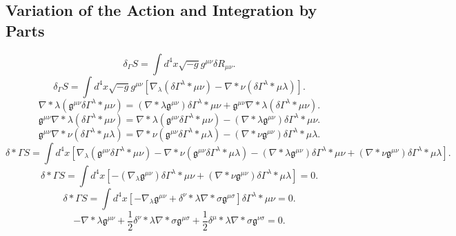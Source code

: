 \documentclass[11pt, a4paper]{report}
\begin{document}
\subsection{Variation of the Action and Integration by Parts}
\begin{equation}
\delta_{\Gamma} S = \int d^{4}x \sqrt{-g} g^{\mu\nu} \delta R_{\mu\nu}.
\end{equation}
\begin{equation}
\label{eq:action_var_gamma}
\delta_{\Gamma} S = \int d^{4}x \sqrt{-g} g^{\mu\nu} \left[ \nabla_{\lambda}(\delta\Gamma^{\lambda}*{\mu\nu}) - \nabla*{\nu}(\delta\Gamma^{\lambda}*{\mu\lambda}) \right].
\end{equation}
\begin{equation}
\nabla*{\lambda}(\mathfrak{g}^{\mu\nu}\delta\Gamma^{\lambda}*{\mu\nu}) = (\nabla*{\lambda}\mathfrak{g}^{\mu\nu})\delta\Gamma^{\lambda}*{\mu\nu} + \mathfrak{g}^{\mu\nu}\nabla*{\lambda}(\delta\Gamma^{\lambda}*{\mu\nu}).
\end{equation}
\begin{equation}
\mathfrak{g}^{\mu\nu}\nabla*{\lambda}(\delta\Gamma^{\lambda}*{\mu\nu}) = \nabla*{\lambda}(\mathfrak{g}^{\mu\nu}\delta\Gamma^{\lambda}*{\mu\nu}) - (\nabla*{\lambda}\mathfrak{g}^{\mu\nu})\delta\Gamma^{\lambda}*{\mu\nu}.
\end{equation}
\begin{equation}
\mathfrak{g}^{\mu\nu}\nabla*{\nu}(\delta\Gamma^{\lambda}*{\mu\lambda}) = \nabla*{\nu}(\mathfrak{g}^{\mu\nu}\delta\Gamma^{\lambda}*{\mu\lambda}) - (\nabla*{\nu}\mathfrak{g}^{\mu\nu})\delta\Gamma^{\lambda}*{\mu\lambda}.
\end{equation}
\begin{equation}
\delta*{\Gamma} S = \int d^{4}x \left[ \nabla_{\lambda}(\mathfrak{g}^{\mu\nu}\delta\Gamma^{\lambda}*{\mu\nu}) - \nabla*{\nu}(\mathfrak{g}^{\mu\nu}\delta\Gamma^{\lambda}*{\mu\lambda}) - (\nabla*{\lambda}\mathfrak{g}^{\mu\nu})\delta\Gamma^{\lambda}*{\mu\nu} + (\nabla*{\nu}\mathfrak{g}^{\mu\nu})\delta\Gamma^{\lambda}*{\mu\lambda} \right].
\end{equation}
\begin{equation}
\delta*{\Gamma} S = \int d^{4}x \left[ - (\nabla_{\lambda}\mathfrak{g}^{\mu\nu})\delta\Gamma^{\lambda}*{\mu\nu} + (\nabla*{\nu}\mathfrak{g}^{\mu\nu})\delta\Gamma^{\lambda}*{\mu\lambda} \right] = 0.
\end{equation}
\begin{equation}
\delta*{\Gamma} S = \int d^{4}x \left[ - \nabla_{\lambda}\mathfrak{g}^{\mu\nu} + \delta^{\nu}*{\lambda} \nabla*{\sigma}\mathfrak{g}^{\mu\sigma} \right] \delta\Gamma^{\lambda}*{\mu\nu} = 0.
\end{equation}
\begin{equation}
\label{eq:palatini_constraint}
-\nabla*{\lambda}\mathfrak{g}^{\mu\nu} + \frac{1}{2}\delta^{\nu}*{\lambda} \nabla*{\sigma}\mathfrak{g}^{\mu\sigma} + \frac{1}{2}\delta^{\mu}*{\lambda} \nabla*{\sigma}\mathfrak{g}^{\nu\sigma} = 0.
\end{equation}
\end{document}
